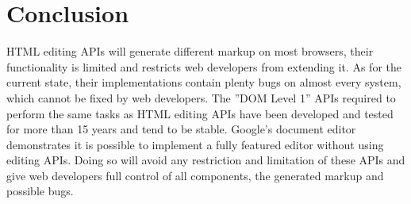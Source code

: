 
\section{Conclusion}

HTML editing APIs will generate different markup on most browsers, their functionality is limited and restricts web developers from extending it. As for the current state, their implementations contain plenty bugs on almost every system, which cannot be fixed by web developers. The ''DOM Level 1'' APIs required to perform the same tasks as HTML editing APIs have been developed and tested for more than 15 years and tend to be stable. Google's document editor demonstrates it is possible to implement a fully featured editor without using editing APIs. Doing so will avoid any restriction and limitation of these APIs and give web developers full control of all components, the generated markup and possible bugs.




%
%
%
%
%
%
%